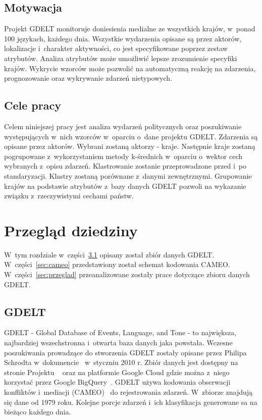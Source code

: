 \documentclass[11pt]{report}
\begin{document}
    \section{Motywacja}\label{sec:motywacja}
    Projekt GDELT monitoruje doniesienia medialne ze wszystkich krajów, w~ponad 100 językach, każdego dnia.
    Wszystkie wydarzenia opisane są przez aktorów, lokalizacje i~charakter aktywności, co jest specyfikowane poprzez zestaw atrybutów.
    Analiza atrybutów może umożliwić lepsze zrozumienie specyfiki krajów.
    Wykrycie wzorców może pozwolić na automatyczną reakcję na zdarzenia, prognozowanie oraz wykrywanie zdarzeń nietypowych.


    \section{Cele pracy}\label{sec:cele-pracy}
    Celem niniejszej pracy jest analiza wydarzeń politycznych oraz poszukiwanie występujących w~nich wzorców w~oparciu o~dane projektu GDELT.
    Zdarzenia są opisane przez aktorów.
    Wybrani zostaną aktorzy - kraje.
    Następnie kraje zostaną pogrupowane z~wykorzystaniem metody k-średnich w~oparciu o~wektor cech wybranych z~opisu zdarzeń.
    Klastrowanie zostanie przeprowadzone przed i~po standaryzacji.
    Klastry zostaną porównane z~danymi zewnętrznymi.
    Grupowanie krajów na podstawie atrybutów z~bazy danych GDELT pozwoli na wykazanie związku z~rzeczywistymi cechami państw.


    \chapter{Przegląd dziedziny}\label{ch:przegląd-dziedziny}
    W~tym rozdziale w~części~\ref{sec:gdelt} opisany został zbiór danych GDELT.
    W~części~\ref{sec:cameo} przedstawiony został schemat kodowania CAMEO.
    W~części~\ref{sec:przeglad} przeanalizowane zostały prace dotyczące zbioru danych GDELT.


    \section{GDELT}\label{sec:gdelt}
    GDELT - Global Database of Events, Language, and Tone - to największa, najbardziej wszechstronna i~otwarta baza danych jaka powstała.
    Wczesne poszukiwania prowadzące do stworzenia GDELT zostały opisane przez Philipa Schrodta w~dokumencie~\cite{Schrodt2010} w~styczniu 2010 r.
    Zbiór danych jest dostępny na stronie Projektu ~\cite{gdelt} oraz na platformie Google Cloud gdzie można z~niego korzystać przez Google BigQuery~\cite{BigQuery2014}.
    GDELT używa kodowania obserwacji konfliktów i~mediacji (CAMEO)~\cite{GDELTDocumentation} do rejestrowania zdarzeń.
    W~zbiorze znajdują się dane od 1979 roku.
    Kolejne porcje zdarzeń i~ich klasyfikacja generowane sa na bieżąco każdego dnia.
\end{document}
